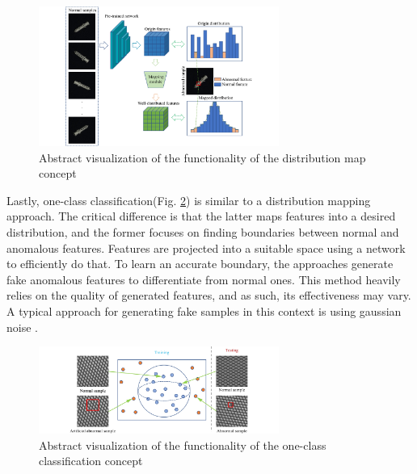 \begin{figure}[H]
\centering
\includegraphics[width=0.7\textwidth]{figures/approachvizgeneral/distmapviz.jpg}
\caption{Abstract visualization of the functionality of the distribution map concept \cite{liu2024deep}}
\label{fig:distmapviz}
\end{figure}

Lastly, one-class classification(Fig. \ref{fig:OCCviz}) is 
similar to a distribution mapping approach. The critical difference is that the latter maps features into a desired distribution, and the former focuses on finding boundaries between normal 
and anomalous features. Features are projected into a suitable space using a network to efficiently do that. To learn an accurate boundary, the approaches generate fake anomalous features to 
differentiate from normal ones. This method heavily relies on the quality of generated features, and as such, its effectiveness may vary. A typical approach for generating fake samples 
in this context is using gaussian noise \cite{liu2023simplenet}.

\begin{figure}[H]
\centering
\includegraphics[width=0.7\textwidth]{figures/approachvizgeneral/OCCviz.jpg}
\caption{Abstract visualization of the functionality of the one-class classification concept \cite{liu2024deep}}
\label{fig:OCCviz}
\end{figure}



